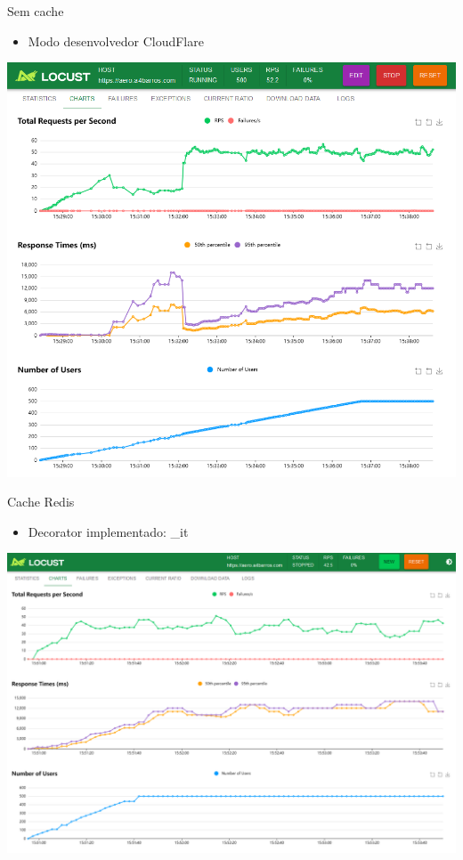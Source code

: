 \documentclass{beamer}
\begin{document}
\begin{frame}{Sem cache}
    \begin{itemize}
        \item Modo desenvolvedor CloudFlare
    \end{itemize}    

    \begin{center}
        \includegraphics[width=0.6\linewidth]{img/locust-no-cache.png}
    \end{center}
\end{frame}

\begin{frame}{Cache Redis}
    \begin{itemize}
        \item Decorator implementado: \@cache\_it
    \end{itemize}

    \begin{center}
    \includegraphics[width=0.6\linewidth]{img/locust-cache-redis.png}
    \end{center}
\end{frame}
\end{document}
